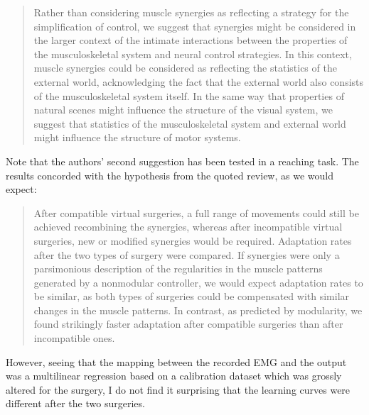 {            \begin{quote}
            Rather than considering muscle synergies as reflecting a
            strategy for the simplification of control, we suggest that
            synergies might be considered in the larger context of the
            intimate interactions between the properties of the
            musculoskeletal system and neural control strategies. In
            this context, muscle synergies could be considered as
            reflecting the statistics of the external world,
            acknowledging the fact that the external world also consists
            of the musculoskeletal system itself. In the same way that
            properties of natural scenes might influence the structure
            of the visual system, we suggest that statistics of the
            musculoskeletal system and external world might influence
            the structure of motor systems.
            \end{quote}

            Note that the authors' second suggestion has been tested in
            a reaching task. The results concorded with the hypothesis
            from the quoted review, as we would expect:

            \begin{quote}
            After compatible virtual surgeries, a full range of
            movements could still be achieved recombining the synergies,
            whereas after incompatible virtual surgeries, new or
            modified synergies would be required. Adaptation rates after
            the two types of surgery were compared. If synergies were
            only a parsimonious description of the regularities in the
            muscle patterns generated by a nonmodular controller, we
            would expect adaptation rates to be similar, as both types
            of surgeries could be compensated with similar changes in
            the muscle patterns. In contrast, as predicted by
            modularity, we found strikingly faster adaptation after
            compatible surgeries than after incompatible ones.
            \end{quote}

            However, seeing that the mapping between the recorded EMG
            and the output was a multilinear regression based on a
            calibration dataset which was grossly altered for the
            surgery, I do not find it surprising that the learning
            curves were different after the two surgeries.

}

